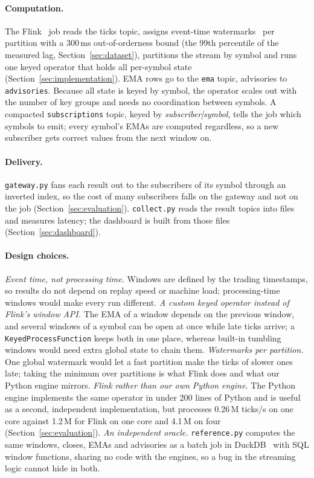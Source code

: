 \paragraph{Computation.}
The Flink~\cite{carbone2015flink} job reads the ticks topic, assigns event-time watermarks~\cite{akidau2015dataflow}
per partition with a 300\,ms
out-of-orderness bound (the 99th percentile of the measured lag, Section~\ref{sec:dataset}), partitions the
stream by symbol and runs one keyed operator that holds all per-symbol state (Section~\ref{sec:implementation}).
EMA rows go to the \texttt{ema} topic, advisories to \texttt{advisories}. Because all state is keyed by symbol,
the operator scales out with the number of key groups and needs no coordination between symbols. A compacted
\texttt{subscriptions} topic, keyed by \emph{subscriber|symbol}, tells the job which symbols to emit; every
symbol's EMAs are computed regardless, so a new subscriber gets correct values from the next window on.

\paragraph{Delivery.}
\texttt{gateway.py} fans each result out to the subscribers of its symbol through an inverted index, so the
cost of many subscribers falls on the gateway and not on the job (Section~\ref{sec:evaluation}).
\texttt{collect.py} reads the result topics into files and measures latency; the dashboard is built from those
files (Section~\ref{sec:dashboard}).

\paragraph{Design choices.}
\emph{Event time, not processing time.} Windows are defined by the trading timestamps, so results do not depend
on replay speed or machine load; processing-time windows would make every run different.
\emph{A custom keyed operator instead of Flink's window API.} The EMA of a window depends on the previous
window, and several windows of a symbol can be open at once while late ticks arrive; a
\texttt{KeyedProcessFunction} keeps both in one place, whereas built-in tumbling windows would need extra global
state to chain them.
\emph{Watermarks per partition.} One global watermark would let a fast partition make the ticks of slower ones
late; taking the minimum over partitions is what Flink does and what our Python engine mirrors.
\emph{Flink rather than our own Python engine.} The Python engine implements the same operator in under 200
lines of Python and is useful as a second, independent implementation, but processes 0.26\,M ticks/s on one core against
1.2\,M for Flink on one core and 4.1\,M on four (Section~\ref{sec:evaluation}).
\emph{An independent oracle.} \texttt{reference.py} computes the same windows, closes, EMAs and advisories as a
batch job in DuckDB~\cite{raasveldt2019duckdb} with SQL window functions, sharing no code with the engines, so a bug in the streaming logic
cannot hide in both.
